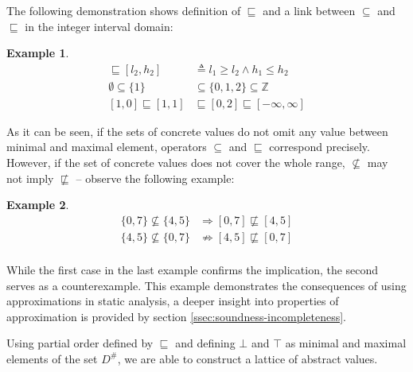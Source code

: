 \documentclass[12pt,oneside]{fithesis2}
\theoremstyle{definition}
\newtheorem{exmp}{Example}[section]
\begin{document}
The following demonstration shows definition of $\sqsubseteq$ and a link between $\subseteq$ and $\sqsubseteq$ in the integer interval domain:

\begin{exmp}
  \begin{align*}
    [l_1, h_1] \sqsubseteq [l_2, h_2] &\triangleq l_1 \ge l_2 \wedge h_1 \le h_2\\
    \emptyset \subseteq \{1\} &\subseteq \{0, 1, 2\} \subseteq \mathbb Z\\
    [1,0] \sqsubseteq [1,1] &\sqsubseteq [0,2] \sqsubseteq [-\infty,\infty]
  \end{align*}
\end{exmp}

As it can be seen, if the sets of concrete values do not omit any value between minimal and maximal element, operators $\subseteq$ and $\sqsubseteq$ correspond precisely. However, if the set of concrete values does not cover the whole range, $\not\subseteq$ may not imply $\not\sqsubseteq$ -- observe the following example:

\begin{exmp}
  \begin{align*}
    \{0, 7\} \not\subseteq \{4, 5\} &\Rightarrow [0,7] \not\sqsubseteq [4,5]\\
    \{ 4, 5\} \not\subseteq \{0, 7\} &\not\Rightarrow [4,5] \not\sqsubseteq [0,7]\\
  \end{align*}
\end{exmp}

While the first case in the last example confirms the implication, the second serves as a counterexample. This example demonstrates the consequences of using approximations in static analysis, a deeper insight into properties of approximation is provided by section \ref{ssec:soundness-incompleteness}.

Using partial order defined by $\sqsubseteq$ and defining $\bot$ and $\top$ as minimal and maximal elements of the set $D^\#$, we are able to construct a lattice of abstract values.
\end{document}
